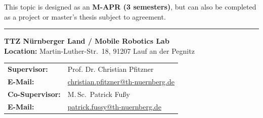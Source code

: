 \documentclass{ohm_project_description}
\begin{document}
\vspace{0.5cm}
This topic is designed as an \textbf{M-APR (3 semesters)}, but can also be completed as a project or master's thesis subject to agreement.

\vfill
\textcolor{ohm_red}{\rule{\linewidth}{0.4mm}}
\textbf{\textcolor{ohm_red}{TTZ Nürnberger Land / Mobile Robotics Lab}} \\
\textbf{Location:} Martin-Luther-Str.\ 18, 91207 Lauf an der Pegnitz \\[4pt]
\begin{tabular}{@{}ll}
\textbf{Supervisor:}    & Prof. Dr. Christian Pfitzner \\
\textbf{E-Mail:}        & \href{mailto:christian.pfitzner@th-nuernberg.de}{christian.pfitzner@th-nuernberg.de} \\
\textbf{Co-Supervisor:} & M.\,Sc.\ Patrick Fußy \\
\textbf{E-Mail:}        & \href{mailto:patrick.fussy@th-nuernberg.de}{patrick.fussy@th-nuernberg.de} \\
\end{tabular}
\end{document}
